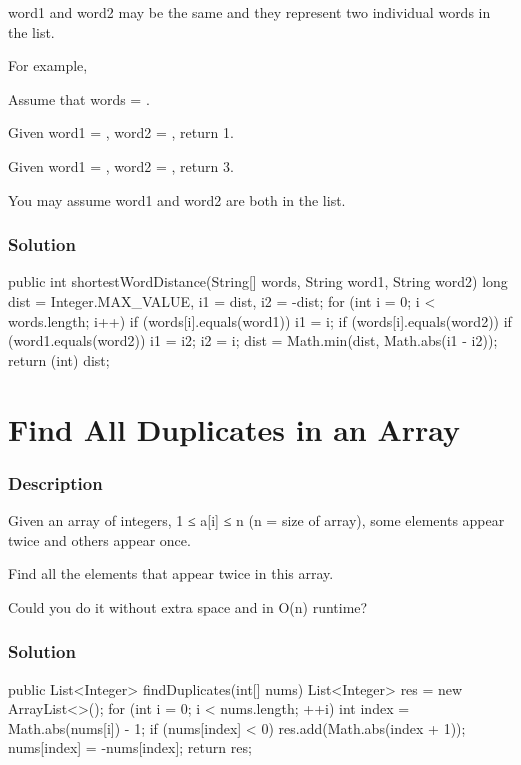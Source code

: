 word1 and word2 may be the same and they represent two individual words in the list.

For example,

Assume that words = .

Given word1 = , word2 = , return 1.

Given word1 = , word2 = , return 3.


You may assume word1 and word2 are both in the list.
\subsubsection{Solution}

\begin{Code}
public int shortestWordDistance(String[] words, String word1, String word2) {
    long dist = Integer.MAX_VALUE, i1 = dist, i2 = -dist;
    for (int i = 0; i < words.length; i++) {
        if (words[i].equals(word1))
            i1 = i;
        if (words[i].equals(word2)) {
            if (word1.equals(word2))
                i1 = i2;
            i2 = i;
        }
        dist = Math.min(dist, Math.abs(i1 - i2));
    }
    return (int) dist;
}
\end{Code}

\newpage

\section{Find All Duplicates in an Array} %

\subsubsection{Description}
Given an array of integers, 1 ≤ a[i] ≤ n (n = size of array), some elements appear twice and others appear once.

Find all the elements that appear twice in this array.

Could you do it without extra space and in O(n) runtime?
\subsubsection{Solution}

\begin{Code}
public List<Integer> findDuplicates(int[] nums) {
    List<Integer> res = new ArrayList<>();
    for (int i = 0; i < nums.length; ++i) {
        int index = Math.abs(nums[i]) - 1;
        if (nums[index] < 0)
            res.add(Math.abs(index + 1));
        nums[index] = -nums[index];
    }
    return res;
}
\end{Code}

